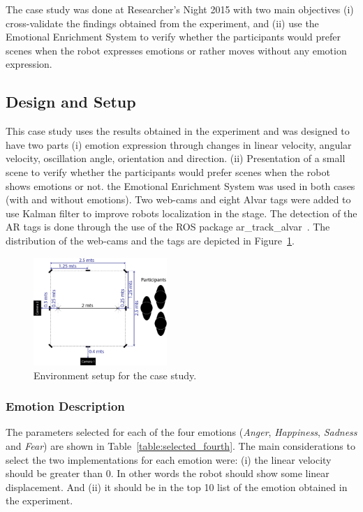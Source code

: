 The case study was done at Researcher's Night 2015 with two main objectives (i) cross-validate the findings obtained from the experiment, and (ii) use the Emotional Enrichment System to verify whether the participants would prefer scenes when the robot expresses emotions or rather moves without any emotion expression.

\subsection{Design and Setup}

This case study uses the results obtained in the experiment and was designed to have two parts (i) emotion expression through changes in linear velocity, angular velocity, oscillation angle, orientation and direction.  
(ii) Presentation of a small scene to verify whether the participants would prefer scenes when the robot shows emotions or not. the Emotional Enrichment System was used in both cases (with and without emotions). Two web-cams and eight Alvar tags were added to use Kalman filter to improve robots localization in the stage. The detection of the AR tags is done through the use of the ROS package ar\_track\_alvar~\cite{artag2015}. The distribution of the web-cams and the tags are depicted in Figure~\ref{fig:setup_fourth}. 

\begin{figure}
	\centering
	\includegraphics[width=0.45\textwidth]{./Images/FourthCase.png} 
	\caption{Environment setup for the case study.}
	\label{fig:setup_fourth}
\end{figure}

\subsubsection{Emotion Description}

The parameters selected for each of the four emotions (\textit{Anger}, \textit{Happiness}, \textit{Sadness} and \textit{Fear}) are shown in Table~\ref{table:selected_fourth}. The main considerations to select the two implementations for each emotion were: (i) the linear velocity should be greater than $0$. In other words the robot should show some linear displacement. And (ii) it should be in the top 10 list of the emotion obtained in the experiment.

